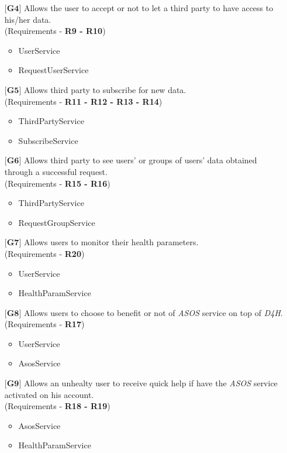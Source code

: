 \begin{itemize}
{\begin{itemize}
\begin{itemize}
					\end{itemize}
				\end{itemize}}
	\item[${\textbf{[G4]}}$] {Allows the user to accept or not to let a third party to have access to his/her data.\\(Requirements - 	\textbf{R9 - R10})}
	\begin{itemize}
		\item UserService
		\item RequestUserService	
	\end{itemize}
	\item[${\textbf{[G5]}}$] {Allows third party to subscribe for new data.\\(Requirements - \textbf{R11 - R12 - R13 - R14})}
	\begin{itemize}
		\item ThirdPartyService
		\item SubscribeService	
	\end{itemize}
	\item[${\textbf{[G6]}}$] {Allows third party to see users' or groups of users' data obtained through a successful request.\\			(Requirements - \textbf{R15 - R16})}
	\begin{itemize}
		\item ThirdPartyService
		\item RequestGroupService	
	\end{itemize}
	\item[${\textbf{[G7]}}$] {Allows users to monitor their health parameters.\\(Requirements - \textbf{R20})}
	\begin{itemize}
		\item UserService
		\item HealthParamService
	\end{itemize}
	\item[${\textbf{[G8]}}$] {Allows users to choose to benefit or not of \hbox{\emph{ASOS}} service on top of 					\hbox{\emph{D4H}}.\\(Requirements - \textbf{R17})}
	\begin{itemize}
		\item UserService
		\item AsosService
	\end{itemize}
	\item[${\textbf{[G9]}}$] {Allows an unhealty user to receive quick help if have the \hbox{\emph{ASOS}} service activated on 		his account.\\(Requirements - \textbf{R18 - R19})}
	\begin{itemize}
		\item AsosService	
		\item HealthParamService
	\end{itemize}	
\end{itemize}